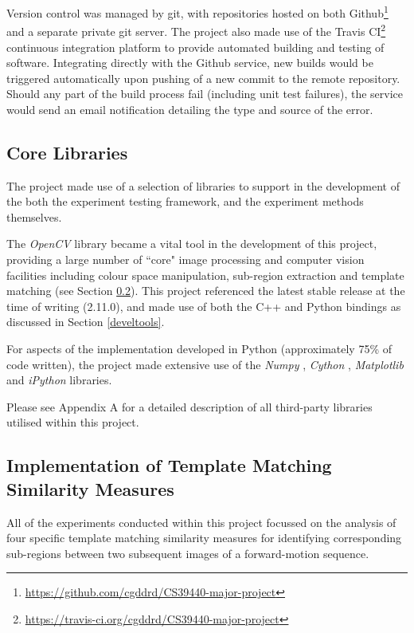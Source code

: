 Version control was managed by git, with repositories hosted on both Github\footnote{\url{https://github.com/cgddrd/CS39440-major-project}} and a separate private git server. The project also made use of the Travis CI\footnote{\url{https://travis-ci.org/cgddrd/CS39440-major-project}} continuous integration platform to provide automated building and testing of software. Integrating directly with the Github service, new builds would be triggered automatically upon pushing of a new commit to the remote repository. Should any part of the build process fail (including unit test failures), the service would send an email notification detailing the type and source of the error.  

\subsection{Core Libraries}
\label{libs}

The project made use of a selection of libraries to support in the development of the both the experiment testing framework, and the experiment methods themselves. 

The \textit{OpenCV} library \cite{opencv} became a vital tool in the development of this project, providing a large number of ``core" image processing and computer vision facilities including colour space manipulation, sub-region extraction and template matching (see Section \ref{templmatchopencv}). This project referenced the latest stable release at the time of writing (2.11.0), and made use of both the C++ and Python bindings as discussed in Section \ref{develtools}.

For aspects of the implementation developed in Python (approximately 75\% of code written), the project made extensive use of the \textit{Numpy} \cite{numpy}, \textit{Cython} \cite{cython}, \textit{Matplotlib} \cite{matplotlib} and \textit{iPython} \cite{ipython} libraries. 

Please see Appendix A for a detailed description of all third-party libraries utilised within this project.

\subsection{Implementation of Template Matching Similarity Measures}
\label{templmatchopencv}

All of the experiments conducted within this project focussed on the analysis of four specific template matching similarity measures for identifying corresponding sub-regions between two subsequent images of a forward-motion sequence.

